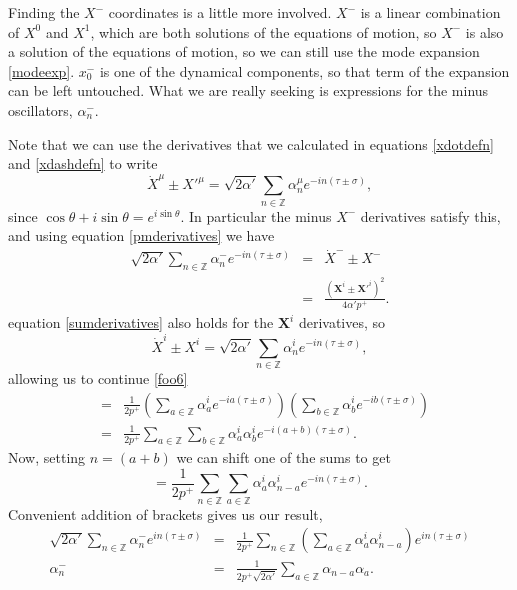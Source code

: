\documentclass[a4paper,12pt]{article}
\numberwithin{equation}{section}
\begin{document}
Finding the $X^-$ coordinates is a little more involved. $X^-$ is a linear combination of $X^0$ and $X^1$, which are both solutions of the equations of motion, so $X^-$ is also a solution of the equations of motion, so we can still use the mode expansion \ref{modeexp}. $x_0^-$ is one of the dynamical components, so that term of the expansion can be left untouched. What we are really seeking is expressions for the minus oscillators, $\alpha_n^-$. 

Note that we can use the derivatives that we calculated in equations \ref{xdotdefn} and \ref{xdashdefn} to write
\begin{equation}\label{sumderivatives}
\dot{X}^\mu \pm X'^\mu = \sqrt{2\alpha'}\sum_{n \in \mathbb{Z}}\alpha_n^\mu e^{-in(\tau \pm \sigma)},
\end{equation}
since $\cos \theta + i \sin \theta = e^{i\sin\theta}$. In particular the minus $X^-$ derivatives satisfy this, and using equation \ref{pmderivatives} we have
\begin{eqnarray}
\sqrt{2\alpha'}\sum_{n \in \mathbb{Z}}\alpha_n^- e^{-in(\tau \pm \sigma)} &=& \dot{X}^- \pm X^-\nonumber\\
&=& \frac{(\mathbf{X}^i \pm \mathbf{X}'^i)^2}{4\alpha'p^+}\label{foo6}.
\end{eqnarray}
equation \ref{sumderivatives} also holds for the $\mathbf{X}^i$ derivatives, so 
\begin{equation}
\dot{X}^i \pm X^i = \sqrt{2\alpha'}\sum_{n \in \mathbb{Z}}\alpha_n^i e^{-in(\tau \pm \sigma)},
\end{equation}
allowing us to continue \ref{foo6}
\begin{eqnarray*}
&=& \frac{1}{2p^+}\left(\sum_{a \in \mathbb{Z}}\alpha_a^i e^{-ia(\tau \pm \sigma)}\right)\left(\sum_{b \in \mathbb{Z}}\alpha_b^i e^{-ib(\tau \pm \sigma)}\right)\\
&=& \frac{1}{2p^+}\sum_{a \in \mathbb{Z}}\sum_{b \in \mathbb{Z}}\alpha_a^i\alpha_b^ie^{-i(a+b)(\tau \pm \sigma)}.
\end{eqnarray*}
Now, setting $n=(a+b)$ we can shift one of the sums to get
\begin{equation}
= \frac{1}{2p^+}\sum_{n \in \mathbb{Z}}\sum_{a \in \mathbb{Z}}\alpha_a^i\alpha_{n-a}^ie^{-in(\tau \pm \sigma)}.
\end{equation}
Convenient addition of brackets gives us our result,
\begin{eqnarray}
\sqrt{2\alpha'}\sum_{n \in \mathbb{Z}} \alpha^-_n e^{in(\tau \pm \sigma)} &=& \frac{1}{2p^+}\sum_{n \in \mathbb{Z}}\left(\sum_{a \in \mathbb{Z}} \alpha_a^i\alpha_{n-a}^i\right)e^{in(\tau \pm \sigma)}\\
\alpha^-_n&=& \frac{1}{2p^+\sqrt{2\alpha'}}\sum_{a \in \mathbb{Z}}\alpha_{n-a}\alpha_a\label{minusoscillators}.
\end{eqnarray}
\end{document}
